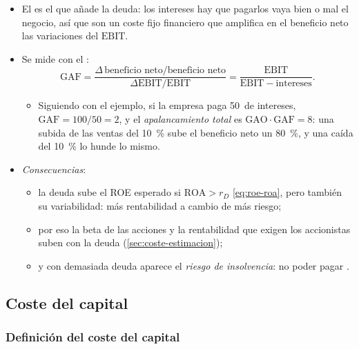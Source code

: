 \documentclass[11pt]{article}
\begin{document}
\begin{itemize}
\item El  es el que añade la deuda: los intereses hay que pagarlos vaya bien o mal el negocio, así que son un coste fijo financiero que amplifica en el beneficio neto las variaciones del $\mathrm{EBIT}$.
\item Se mide con el :
  \[
  \mathrm{GAF}=\frac{\Delta\,\text{beneficio neto}/\text{beneficio neto}}{\Delta\mathrm{EBIT}/\mathrm{EBIT}}=\frac{\mathrm{EBIT}}{\mathrm{EBIT}-\text{intereses}}.
  \]
  \begin{itemize}
  \item Siguiendo con el ejemplo, si la empresa paga 50~de intereses, $\mathrm{GAF}=100/50=2$, y el \emph{apalancamiento total} es $\mathrm{GAO}\cdot\mathrm{GAF}=8$: una subida de las ventas del 10~\% sube el beneficio neto un 80~\%, y una caída del 10~\% lo hunde lo mismo.
  \end{itemize}
\item \emph{Consecuencias}:
  \begin{itemize}
  \item la deuda sube el ROE esperado si $\mathrm{ROA}>r_D$ \eqref{eq:roe-roa}, pero también su variabilidad: más rentabilidad a cambio de más riesgo;
  \item por eso la beta de las acciones y la rentabilidad que exigen los accionistas suben con la deuda (\ref{sec:coste-estimacion});
  \item y con demasiada deuda aparece el \emph{riesgo de insolvencia}: no poder pagar .
  \end{itemize}
\end{itemize}

\subsection{Coste del capital}\label{sec:coste-capital}

\subsubsection{Definición del coste del capital}\label{sec:coste-definicion}
\end{document}
